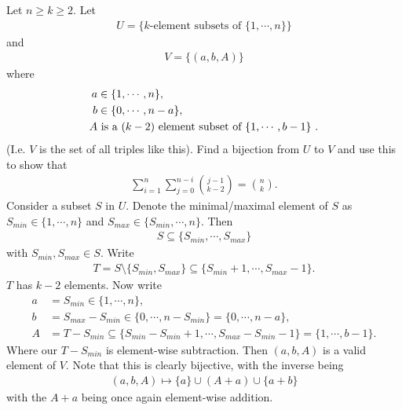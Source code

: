 \begin{enumerate}
     Let $n \geq k \geq 2$. Let
    \begin{align*}
        U = \{ \text{$k$-element subsets of $\{ 1, \cdots, n\}$} \}
    \end{align*}
    and
    \begin{align*}
        V = \{ (a,b,A) \}
    \end{align*}
    where
    \begin{align*}
        a &\in \{ 1 , \cdots, n \},\\
        b &\in \{ 0, \cdots, n-a \},\\
        A &\text{ is a $(k-2)$ element subset of $ \{ 1, \cdots, b-1 \}$ }.
    \end{align*}
    (I.e. $V$ is the set of all triples like this). Find a bijection from $U$ to $V$ and use this to show that
    \begin{align*}
        \sum_{i=1}^n \sum_{j=0}^{n-i} \binom{j-1}{k-2} = \binom{n}{k}.
    \end{align*}
    \answer Consider a subset $S$ in $U$. Denote the minimal/maximal element of $S$ as $S_{min} \in \{ 1 , \cdots, n\}$ and $S_{max} \in \{ S_{min} , \cdots, n \}$. Then
    \begin{align*}
        S \subseteq \{ S_{min} , \cdots , S_{max} \}
    \end{align*}
    with $S_{min} , S_{max} \in S$. Write
    \begin{align*}
        T = S \setminus \{ S_{min} , S_{max} \} \subseteq \{ S_{min} + 1 , \cdots , S_{max} - 1 \}.
    \end{align*}
    $T$ has $k-2$ elements. Now write
    \begin{align*}
        a &= S_{min} \in \{ 1 , \cdots, n \},\\
        b &= S_{max} - S_{min} \in \{0 , \cdots, n - S_{min} \} =  \{0 , \cdots, n - a \},\\
        A &= T - S_{min} \subseteq \{ S_{min} - S_{min} + 1 , \cdots , S_{max} - S_{min} - 1 \} = \{ 1 , \cdots , b - 1 \}.
    \end{align*}
    Where our $T - S_{min}$ is element-wise subtraction. Then $(a,b,A)$ is a valid element of $V$. Note that this is clearly bijective, with the inverse being
    \begin{align*}
        (a , b ,A) \mapsto \{ a\}  \cup (A+a) \cup \{ a+b \}
    \end{align*}
    with the $A+a$ being once again element-wise addition.


\end{enumerate}

